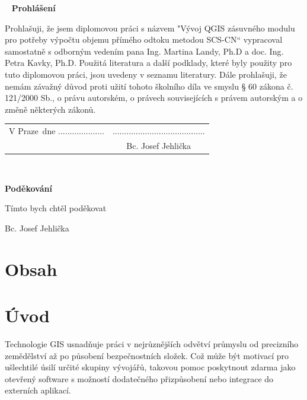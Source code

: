 \documentclass[a4paper,oneside,12pt]{book}
\newcommand{\tb}{\textbf} %
\newcommand{\autor}{Bc. Josef Jehlička}   %
\newcommand{\kde}{Praze} %
\newcommand{\prohlaseni}{Prohlašuji, že jsem diplomovou práci s názvem "Vývoj QGIS zásuvného modulu pro potřeby výpočtu objemu přímého odtoku metodou SCS-CN“ vypracoval samostatně s odborným vedením pana Ing. Martina Landy, Ph.D a doc. Ing. Petra Kavky, Ph.D. Použitá literatura a další podklady, které byly použity pro tuto diplomovou práci, jsou uvedeny v seznamu literatury. Dále prohlašuji, že nemám závažný důvod proti užití tohoto školního díla ve smyslu § 60 zákona č. 121/2000 Sb., o právu autorském, o právech souvisejících s právem autorským a o změně některých zákonů.
} %
\newcommand{\podekovani}{Tímto bych chtěl poděkovat } %
\begin{document}
\newpage %
\thispagestyle{empty}  %

~ %
\vfill %
\vspace{1em}
\tb{Prohlášení} %

\vspace{1em} %
\prohlaseni

\vspace{2em}  %
\hspace{-0.5em}\begin{tabularx}{\textwidth}{X c}  %
V \kde\ dne .................... &........................................ \\	%
	& \autor
\end{tabularx}	%







\newpage %
\thispagestyle{empty}  %

~
\vfill %


\vspace{1em}
\tb{Poděkování}

\vspace{1em} %
\podekovani
\begin{flushright}
\autor
\end{flushright}  %





\newpage
\chapter*{Obsah}




\newpage
\chapter*{Úvod} \label{uvod}
Technologie GIS usnadňuje práci v nejrůznějších odvětví průmyslu od precizního zemědělství až po působení bezpečnostních složek. Což může být motivací pro ušlechtilé úsilí určité skupiny vývojářů, takovou pomoc poskytnout zdarma jako otevřený software s možností dodatečného přizpůsobení nebo integrace do externích aplikací. 
\end{document}
